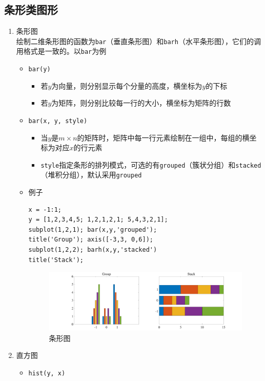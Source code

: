 \subsection{条形类图形}
\label{条形类}
\begin{enumerate}
	\item 条形图\\
	绘制二维条形图的函数为\lstinline|bar|（垂直条形图）和\lstinline|barh|（水平条形图），它们的调用格式是一致的。以\lstinline|bar|为例
	\begin{itemize}
		\item \lstinline|bar(y)|
		\begin{itemize}
			\item 若$y$为向量，则分别显示每个分量的高度，横坐标为$y$的下标
			\item 若$y$为矩阵，则分别比较每一行的大小，横坐标为矩阵的行数
		\end{itemize}
		\item \lstinline|bar(x, y, style)|
		\begin{itemize}
			\item 当$y$是$m \times n$的矩阵时，矩阵中每一行元素绘制在一组中，每组的横坐标为对应$x$的行元素
			\item \lstinline|style|指定条形的排列模式，可选的有\lstinline|grouped|（簇状分组）和\lstinline|stacked|（堆积分组），默认采用\lstinline|grouped|
		\end{itemize}
	\item 例子
	\begin{lstlisting}
x = -1:1;
y = [1,2,3,4,5; 1,2,1,2,1; 5,4,3,2,1];
subplot(1,2,1);	bar(x,y,'grouped');
title('Group');	axis([-3,3, 0,6]);
subplot(1,2,2);	barh(x,y,'stacked')
title('Stack');
	\end{lstlisting}
\begin{figure}[!htb]
	\centering
	\includegraphics[width=\linewidth]{pic/条形图.pdf}
	\caption{条形图}
\end{figure}
	\end{itemize}
\item 直方图
\begin{itemize}
	\item \lstinline|hist(y, x)|

\end{itemize}
\end{enumerate}
